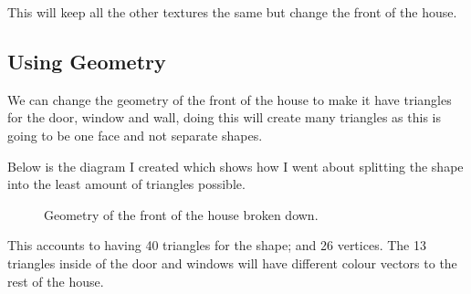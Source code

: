 \documentclass[10pt]{report}
\begin{document}
This will keep all the other textures the same but change the front of the house.

\subsection{Using Geometry}

We can change the geometry of the front of the house to make it have triangles for the door, window and wall, doing this will create many triangles as this is going to be one face and not separate shapes.

Below is the diagram I created which shows how I went about splitting the shape into the least amount of triangles possible.

\begin{figure}[H]
    \centering
    \caption{Geometry of the front of the house broken down.}
\end{figure}

This accounts to having 40 triangles for the shape; and 26 vertices. The 13 triangles inside of the door and windows will have different colour vectors to the rest of the house. 
\end{document}
